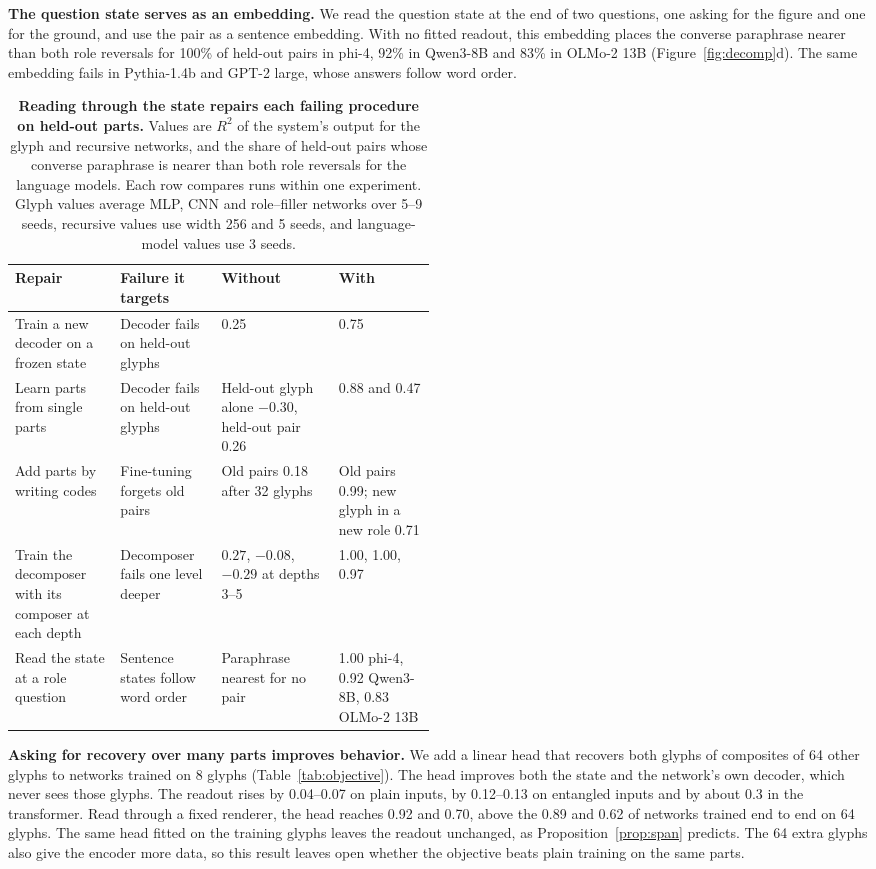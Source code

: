 \documentclass[10pt]{article}
\theoremstyle{plain}
\theoremstyle{remark}
\begin{document}
\textbf{The question state serves as an embedding.} We read the question state at the end of two questions, one asking for the figure and one for the ground, and use the pair as a sentence embedding. With no fitted readout, this embedding places the converse paraphrase nearer than both role reversals for 100\% of held-out pairs in phi-4, 92\% in Qwen3-8B and 83\% in OLMo-2 13B (Figure~\ref{fig:decomp}d). The same embedding fails in Pythia-1.4b and GPT-2 large, whose answers follow word order.

\begin{table}[t]
  \caption{\textbf{Reading through the state repairs each failing procedure on held-out parts.} Values are $R^2$ of the system's output for the glyph and recursive networks, and the share of held-out pairs whose converse paraphrase is nearer than both role reversals for the language models. Each row compares runs within one experiment. Glyph values average MLP, CNN and role--filler networks over 5--9 seeds, recursive values use width 256 and 5 seeds, and language-model values use 3 seeds.}
  \label{tab:remedies}
  \centering\small
  \begin{tabularx}{\linewidth}{@{}P{0.25\linewidth}P{0.24\linewidth}YY@{}}
    \toprule
    Repair & Failure it targets & Without & With \\
    \midrule
    Train a new decoder on a frozen state & Decoder fails on held-out glyphs & 0.25 & 0.75 \\
    Learn parts from single parts & Decoder fails on held-out glyphs & Held-out glyph alone $-0.30$, held-out pair 0.26 & 0.88 and 0.47 \\
    Add parts by writing codes & Fine-tuning forgets old pairs & Old pairs 0.18 after 32 glyphs & Old pairs 0.99; new glyph in a new role 0.71 \\
    Train the decomposer with its composer at each depth & Decomposer fails one level deeper & $0.27$, $-0.08$, $-0.29$ at depths 3--5 & 1.00, 1.00, 0.97 \\
    Read the state at a role question & Sentence states follow word order & Paraphrase nearest for no pair & 1.00 phi-4, 0.92 Qwen3-8B, 0.83 OLMo-2 13B \\
    \bottomrule
  \end{tabularx}
\end{table}

\textbf{Asking for recovery over many parts improves behavior.} We add a linear head that recovers both glyphs of composites of 64 other glyphs to networks trained on 8 glyphs (Table~\ref{tab:objective}). The head improves both the state and the network's own decoder, which never sees those glyphs. The readout rises by 0.04--0.07 on plain inputs, by 0.12--0.13 on entangled inputs and by about 0.3 in the transformer. Read through a fixed renderer, the head reaches 0.92 and 0.70, above the 0.89 and 0.62 of networks trained end to end on 64 glyphs. The same head fitted on the training glyphs leaves the readout unchanged, as Proposition~\ref{prop:span} predicts. The 64 extra glyphs also give the encoder more data, so this result leaves open whether the objective beats plain training on the same parts.
\end{document}
